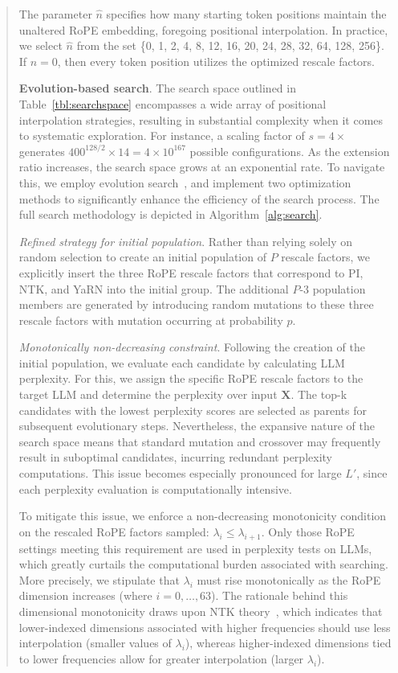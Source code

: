 \begin{abstract}
The parameter $\hat{n}$ specifies how many starting token positions maintain the unaltered RoPE embedding, foregoing positional interpolation. In practice, we select $\hat{n}$ from the set \{0, 1, 2, 4, 8, 12, 16, 20, 24, 28, 32, 64, 128, 256\}. If $\hat{n}=0$, then every token position utilizes the optimized rescale factors.

\textbf{Evolution-based search}. The search space outlined in Table~\ref{tbl:searchspace} encompasses a wide array of positional interpolation strategies, resulting in substantial complexity when it comes to systematic exploration. For instance, a scaling factor of $s=4\times$ generates $400^{128/2}\times14 = 4\times10^{167}$ possible configurations. As the extension ratio increases, the search space grows at an exponential rate. To navigate this, we employ evolution search~\cite{guo2020single}, and implement two optimization methods to significantly enhance the efficiency of the search process. The full search methodology is depicted in Algorithm~\ref{alg:search}.

\textit{Refined strategy for initial population}. Rather than relying solely on random selection to create an initial population of $P$ rescale factors, we explicitly insert the three RoPE rescale factors that correspond to PI, NTK, and YaRN into the initial group. The additional $P$-3 population members are generated by introducing random mutations to these three rescale factors with mutation occurring at probability $p$.

\textit{Monotonically non-decreasing constraint}. Following the creation of the initial population, we evaluate each candidate by calculating LLM perplexity. For this, we assign the specific RoPE rescale factors to the target LLM and determine the perplexity over input $\mathbf{X}$. The top-k candidates with the lowest perplexity scores are selected as parents for subsequent evolutionary steps. Nevertheless, the expansive nature of the search space means that standard mutation and crossover may frequently result in suboptimal candidates, incurring redundant perplexity computations. This issue becomes especially pronounced for large $L'$, since each perplexity evaluation is computationally intensive.

To mitigate this issue, we enforce a non-decreasing monotonicity condition on the rescaled RoPE factors sampled: $\lambda_i \le \lambda_{i+1}$. Only those RoPE settings meeting this requirement are used in perplexity tests on LLMs, which greatly curtails the computational burden associated with searching. More precisely, we stipulate that $\lambda_i$ must rise monotonically as the RoPE dimension increases (where $i = 0, \dots, 63$). The rationale behind this dimensional monotonicity draws upon NTK theory~\cite{jacot2018neural,tancik2020fourier,ntk}, which indicates that lower-indexed dimensions associated with higher frequencies should use less interpolation (smaller values of $\lambda_i$), whereas higher-indexed dimensions tied to lower frequencies allow for greater interpolation (larger $\lambda_i$).


\end{abstract}

